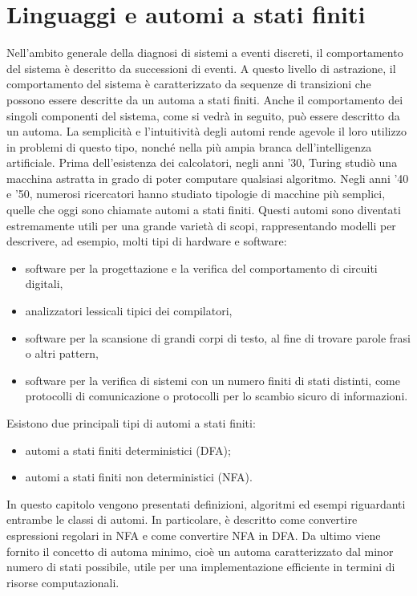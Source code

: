 \chapter{Linguaggi e automi a stati finiti}
Nell'ambito generale della diagnosi di sistemi a eventi discreti, il comportamento del sistema è descritto da successioni di eventi. A questo livello di astrazione, il comportamento del sistema è caratterizzato da sequenze di transizioni che possono essere descritte da un automa a stati finiti. Anche il comportamento dei singoli componenti del sistema, come si vedrà in seguito, può essere descritto da un automa. La semplicità e l'intuitività degli automi rende agevole il loro utilizzo in problemi di questo tipo, nonché nella più ampia branca dell'intelligenza artificiale.
Prima dell'esistenza dei calcolatori, negli anni '30, Turing studiò una macchina astratta in grado di poter computare qualsiasi algoritmo. 
Negli anni '40 e '50, numerosi ricercatori hanno studiato tipologie di macchine più semplici, quelle che oggi sono chiamate automi a stati finiti.
Questi automi sono diventati estremamente utili per una grande varietà di scopi, rappresentando modelli per descrivere, ad esempio, molti tipi di hardware e software:
\begin{itemize}
\item software per la progettazione e la verifica del comportamento di circuiti digitali,
\item analizzatori lessicali tipici dei compilatori,
\item software per la scansione di grandi corpi di testo, al fine di trovare parole frasi o altri pattern,
\item software per la verifica di sistemi con un numero finiti di stati distinti, come protocolli di comunicazione o protocolli per lo scambio sicuro di informazioni.
\end{itemize}
Esistono due principali tipi di automi a stati finiti:
\begin{itemize}
\item automi a stati finiti deterministici (DFA);
\item automi a stati finiti non deterministici (NFA).
\end{itemize}
In questo capitolo vengono presentati definizioni, algoritmi ed esempi riguardanti entrambe le classi di automi. In particolare, è descritto come convertire espressioni regolari in NFA e come convertire NFA in DFA.
Da ultimo viene fornito il concetto di automa minimo, cioè un automa caratterizzato dal minor numero di stati possibile, utile per una implementazione efficiente in termini di risorse computazionali.

